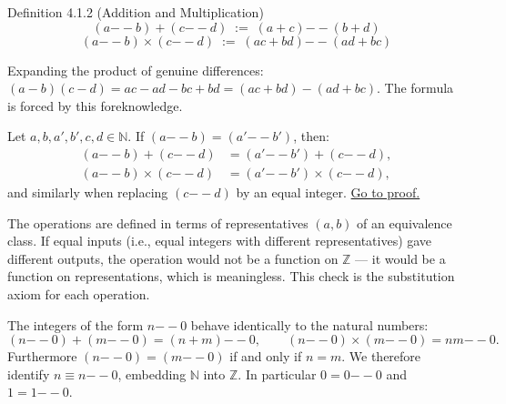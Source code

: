 \begin{propositionbox}{Definition 4.1.2 (Addition and Multiplication)}
\[
(a {-\!\!-} b) + (c {-\!\!-} d) \;:=\; (a+c) {-\!\!-} (b+d)
\]
\[
(a {-\!\!-} b) \times (c {-\!\!-} d) \;:=\; (ac+bd) {-\!\!-} (ad+bc)
\]
\end{propositionbox}

\begin{remark*}
Expanding the product of genuine differences:
$(a-b)(c-d) = ac - ad - bc + bd = (ac+bd) - (ad+bc)$.
The formula is forced by this foreknowledge.
\end{remark*}

\begin{lemma}
\label{lem:int-well-defined}
Let $a, b, a', b', c, d \in \mathbb{N}$.
If $(a {-\!\!-} b) = (a' {-\!\!-} b')$, then:
\begin{align*}
(a {-\!\!-} b) + (c {-\!\!-} d) &= (a' {-\!\!-} b') + (c {-\!\!-} d), \\
(a {-\!\!-} b) \times (c {-\!\!-} d) &= (a' {-\!\!-} b') \times (c {-\!\!-} d),
\end{align*}
and similarly when replacing $(c {-\!\!-} d)$ by an equal integer.
\hyperref[prf:int-well-defined]{Go to proof.}
\end{lemma}

\begin{remark*}
The operations are defined in terms of representatives $(a, b)$ of an
equivalence class.
If equal inputs (i.e., equal integers with different representatives)
gave different outputs, the operation would not be a function on
$\mathbb{Z}$ — it would be a function on representations, which is
meaningless.
This check is the substitution axiom for each operation.
\end{remark*}

\begin{remark*}
The integers of the form $n {-\!\!-} 0$ behave identically to the
natural numbers:
\[
(n {-\!\!-} 0) + (m {-\!\!-} 0) = (n+m) {-\!\!-} 0,
\qquad
(n {-\!\!-} 0) \times (m {-\!\!-} 0) = nm {-\!\!-} 0.
\]
Furthermore $(n {-\!\!-} 0) = (m {-\!\!-} 0)$ if and only if $n = m$.
We therefore identify $n \equiv n {-\!\!-} 0$, embedding $\mathbb{N}$
into $\mathbb{Z}$.
In particular $0 = 0 {-\!\!-} 0$ and $1 = 1 {-\!\!-} 0$.
\end{remark*}

